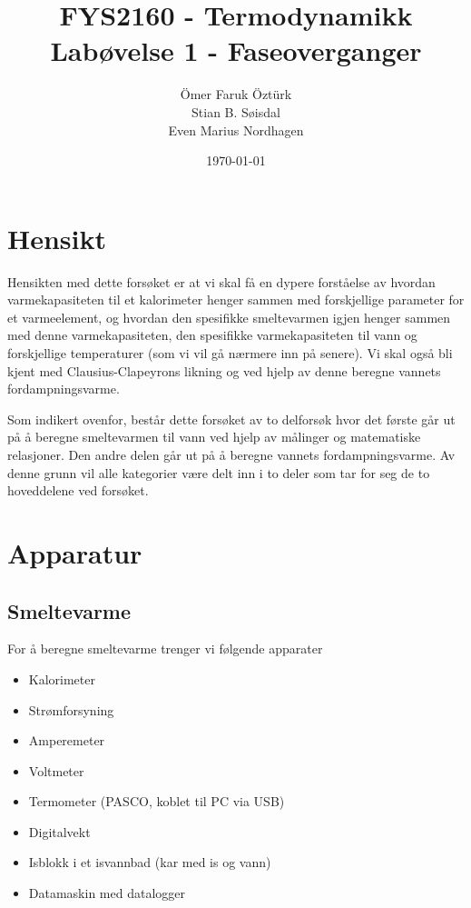 \documentclass[norsk,a4paper,12pt]{article}
\title{FYS2160 - Termodynamikk\\\vspace{2mm} \Large{Labøvelse 1 - Faseoverganger}}
\author{\large \"Omer Faruk \"Ozt\"urk\\ Stian B. S{\o}isdal\\ Even Marius Nordhagen}
\date{\today}
\begin{document}
\maketitle

\section{Hensikt}
Hensikten med dette forsøket er at vi skal få en dypere forståelse av hvordan varmekapasiteten til et kalorimeter henger sammen med forskjellige parameter for et varmeelement, og hvordan den spesifikke smeltevarmen igjen henger sammen med denne varmekapasiteten, den spesifikke varmekapasiteten til vann og forskjellige temperaturer (som vi vil gå nærmere inn på senere). Vi skal også bli kjent med Clausius-Clapeyrons likning og ved hjelp av denne beregne vannets fordampningsvarme.\par\vspace{5mm}

Som indikert ovenfor, består dette forsøket av to delforsøk hvor det første går ut på å beregne smeltevarmen til vann ved hjelp av målinger og matematiske relasjoner. Den andre delen går ut på å beregne vannets fordampningsvarme. Av denne grunn vil alle kategorier være delt inn i to deler som tar for seg de to hoveddelene ved forsøket.

\section{Apparatur}
\subsection{Smeltevarme}
For å beregne smeltevarme trenger vi følgende apparater
\begin{itemize}
\item Kalorimeter
\item Strømforsyning
\item Amperemeter
\item Voltmeter
\item Termometer (PASCO, koblet til PC via USB)
\item Digitalvekt
\item Isblokk i et isvannbad (kar med is og vann)
\item Datamaskin med datalogger
\end{itemize}
\end{document}
